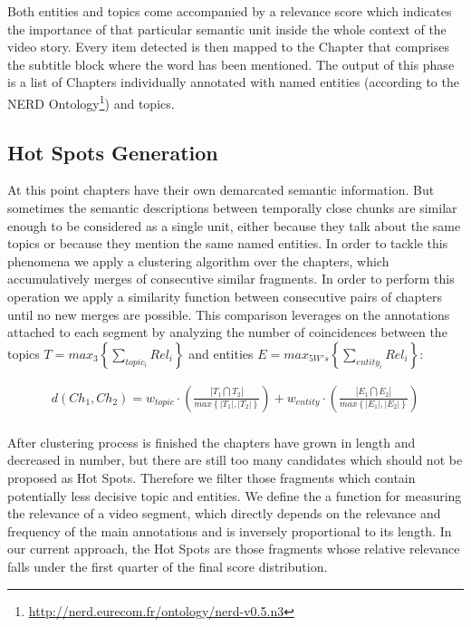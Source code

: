 \documentclass{llncs}
\begin{document}
Both entities and topics come accompanied by a relevance score which indicates the importance of that particular semantic unit inside the whole context of the video story. Every item detected is then mapped to the Chapter that comprises the subtitle block where the word has been mentioned. The output of this phase is a list of Chapters individually annotated with named entities (according to the NERD Ontology\footnote{\fontsize{8pt}{1em}\selectfont \url{http://nerd.eurecom.fr/ontology/nerd-v0.5.n3}}) and topics.


\subsection{Hot Spots Generation}
\label{sec:hotspots}
At this point chapters have their own demarcated semantic information. But sometimes the semantic descriptions between temporally close chunks are similar enough to be considered as a single unit, either because they talk about the same topics or because they mention the same named entities. In order to tackle this phenomena we apply a clustering algorithm over the chapters, which accumulatively merges of consecutive similar fragments.
In order to perform this operation we apply a similarity function between consecutive pairs of chapters until no new merges are possible. This comparison leverages on the annotations attached to each segment by analyzing the number of coincidences between the topics $T = max_{3}\left \{ \sum_{topic_{i}} Rel_{i} \right  \}$ and entities $E = max_{5W's}\left \{ \sum_{entity_{i}} Rel_{i} \right  \}$:

\begin{equation}
\begin{split}
d\left ( Ch_{1} , Ch_{2} \right ) = w_{topic}\cdot \left ( \frac{\left | T_{1} \bigcap T_{2} \right |}{max \left \{ \left | T_{1} \right |, \left | T_{2} \right |\right \}} \right ) + w_{entity}\cdot \left ( \frac{\left | E_{1} \bigcap E_{2} \right |}{max \left \{ \left | E_{1} \right |, \left | E_{2} \right |\right \}} \right ) \\
\end{split}
\end{equation}

After clustering process is finished the chapters have grown in length and decreased in number, but there are still too many candidates which should not be proposed as Hot Spots. Therefore we filter those fragments which contain potentially less decisive topic and entities. We define the a function for measuring the relevance of a video segment, which directly depends on the relevance and frequency of the main annotations and is inversely proportional to its length. In our current approach, the Hot Spots are those fragments whose relative relevance falls under the first quarter of the final score distribution.
\end{document}
